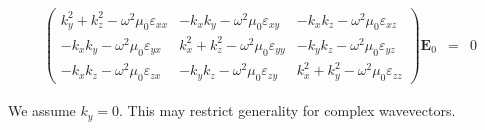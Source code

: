 \documentclass[12pt,a4paper,twoside,openright,BCOR10mm,headsepline,titlepage,abstracton,chapterprefix,final]{scrreprt}
\newcommand\Vector[1]{{\mathbf{#1}}}
\newcommand\vacuum{0}
\newcommand\wavenumber{k}
\newcommand\scalarEfield{E}
\newcommand\Efield{\Vector{\scalarEfield}}
\newcommand\vacuumpermeability{\scalarpermeability_{\vacuum}}
\newcommand\scalarpermeability{\mu}
\newcommand\scalarpermittivity{\varepsilon}
\begin{document}
\begin{eqnarray}
\begin{pmatrix}
 \wavenumber_y^2 + \wavenumber_z^2 - \omega^2 \vacuumpermeability \scalarpermittivity_{xx} 
 &
 - \wavenumber_x \wavenumber_y - \omega^2 \vacuumpermeability \scalarpermittivity_{xy}
 &
 - \wavenumber_x \wavenumber_z - \omega^2 \vacuumpermeability \scalarpermittivity_{xz}
 \\
 - \wavenumber_x \wavenumber_y - \omega^2 \vacuumpermeability \scalarpermittivity_{yx}
 &
 \wavenumber_x^2 + \wavenumber_z^2 - \omega^2 \vacuumpermeability \scalarpermittivity_{yy} 
 &
 - \wavenumber_y \wavenumber_z - \omega^2 \vacuumpermeability \scalarpermittivity_{yz}
 \\
 - \wavenumber_x \wavenumber_z - \omega^2 \vacuumpermeability \scalarpermittivity_{zx}
 &
 - \wavenumber_y \wavenumber_z - \omega^2 \vacuumpermeability \scalarpermittivity_{zy}
 &
 \wavenumber_x^2 + \wavenumber_y^2 - \omega^2 \vacuumpermeability \scalarpermittivity_{zz}  
\end{pmatrix}
\Efield_0
&=& 0 \label{eq:generalDispersionEigenEquation}
\end{eqnarray}

We assume $\wavenumber_y =0$.
This may restrict generality for complex wavevectors.
\end{document}
